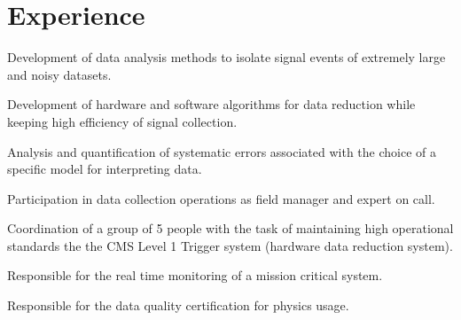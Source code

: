 \documentclass[letterpaper]{deedy-resume} %
\begin{document}
\begin{minipage}[t]{0.66\textwidth} %


\section{Experience}


\vspace{\topsep} %
\begin{tightitemize}
\item Development of data analysis methods to isolate signal events of extremely large and noisy datasets.
\item Development of hardware and software algorithms for data reduction while keeping high efficiency of signal collection.
\item Analysis and quantification of systematic errors associated with the choice of a specific model for interpreting data.
\item Participation in data collection operations as field manager and expert on call.
\end{tightitemize}

\sectionspace %



\begin{tightitemize}
\item Coordination of a group of 5 people with the task of maintaining high operational standards the the CMS Level 1 Trigger system (hardware data reduction system). 
\item Responsible for the real time monitoring of a mission critical system.
\item Responsible for the data quality certification for physics usage.
\end{tightitemize}


\end{minipage}
\end{document}
